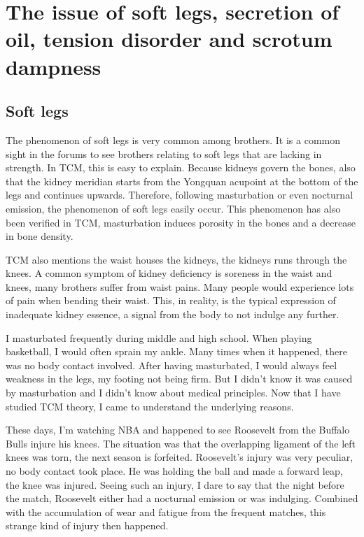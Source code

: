 \documentclass[
]{book}
\begin{document}
\hypertarget{the-issue-of-soft-legs-secretion-of-oil-tension-disorder-and-scrotum-dampness}{%
\chapter{The issue of soft legs, secretion of oil, tension disorder and scrotum dampness}\label{the-issue-of-soft-legs-secretion-of-oil-tension-disorder-and-scrotum-dampness}}

\hypertarget{soft-legs}{%
\section{Soft legs}\label{soft-legs}}

The phenomenon of soft legs is very common among brothers. It is a common sight in the forums to see brothers relating to soft legs that are lacking in strength. In TCM, this is easy to explain. Because kidneys govern the bones, also that the kidney meridian starts from the Yongquan acupoint at the bottom of the legs and continues upwards. Therefore, following masturbation or even nocturnal emission, the phenomenon of soft legs easily occur. This phenomenon has also been verified in TCM, masturbation induces porosity in the bones and a decrease in bone density.

TCM also mentions the waist houses the kidneys, the kidneys runs through the knees. A common symptom of kidney deficiency is soreness in the waist and knees, many brothers suffer from waist pains. Many people would experience lots of pain when bending their waist. This, in reality, is the typical expression of inadequate kidney essence, a signal from the body to not indulge any further.

I masturbated frequently during middle and high school. When playing basketball, I would often sprain my ankle. Many times when it happened, there was no body contact involved. After having masturbated, I would always feel weakness in the legs, my footing not being firm. But I didn't know it was caused by masturbation and I didn't know about medical principles. Now that I have studied TCM theory, I came to understand the underlying reasons.

These days, I'm watching NBA and happened to see Roosevelt from the Buffalo Bulls injure his knees. The situation was that the overlapping ligament of the left knees was torn, the next season is forfeited. Roosevelt's injury was very peculiar, no body contact took place. He was holding the ball and made a forward leap, the knee was injured. Seeing such an injury, I dare to say that the night before the match, Roosevelt either had a nocturnal emission or was indulging. Combined with the accumulation of wear and fatigue from the frequent matches, this strange kind of injury then happened.
\end{document}
